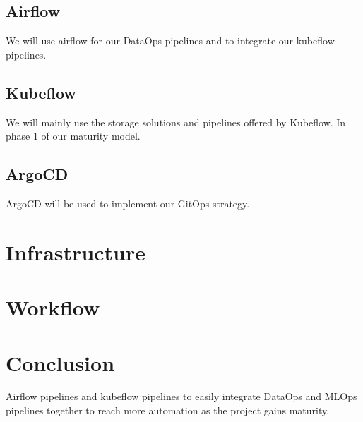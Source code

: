 \subsection{Airflow}\label{subsec:airflow}
We will use airflow for our DataOps pipelines and to integrate our kubeflow pipelines.

\subsection{Kubeflow}\label{subsec:kubeflow}
We will mainly use the storage solutions and pipelines offered by Kubeflow.
In phase 1 of our maturity model.

\subsection{ArgoCD}\label{subsec:argocd}
ArgoCD will be used to implement our GitOps strategy.

\section{Infrastructure}\label{sec:infrastructure}


\section{Workflow}\label{sec:workflow}


\section{Conclusion}\label{sec:conclusion}
Airflow pipelines and kubeflow pipelines to easily integrate DataOps and MLOps pipelines together to reach more automation as the project gains maturity.
